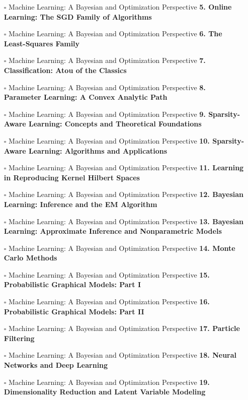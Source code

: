 \documentclass[a4, landscape, 12pt]{article}
\newcommand{\checkbox}{$\square$}%
\begin{document}
\begin{itemize}
{}
\item [\checkbox]  Machine Learning: A Bayesian and Optimization Perspective \textbf{ 5. Online Learning: The SGD Family of Algorithms
}
\item [\checkbox]  Machine Learning: A Bayesian and Optimization Perspective \textbf{ 6. The Least-Squares Family
}
\item [\checkbox]  Machine Learning: A Bayesian and Optimization Perspective \textbf{ 7. Classification: Atou of the Classics
}
\item [\checkbox]  Machine Learning: A Bayesian and Optimization Perspective \textbf{ 8. Parameter Learning: A Convex Analytic Path
}
\item [\checkbox]  Machine Learning: A Bayesian and Optimization Perspective \textbf{ 9. Sparsity-Aware Learning: Concepts and Theoretical Foundations
}
\item [\checkbox]  Machine Learning: A Bayesian and Optimization Perspective \textbf{ 10. Sparsity-Aware Learning: Algorithms and Applications
}
\item [\checkbox]  Machine Learning: A Bayesian and Optimization Perspective \textbf{ 11. Learning in Reproducing Kernel Hilbert Spaces
}
\item [\checkbox]  Machine Learning: A Bayesian and Optimization Perspective \textbf{ 12. Bayesian Learning: Inference and the EM Algorithm
}
\item [\checkbox]  Machine Learning: A Bayesian and Optimization Perspective \textbf{ 13. Bayesian Learning: Approximate Inference and Nonparametric Models
}
\item [\checkbox]  Machine Learning: A Bayesian and Optimization Perspective \textbf{ 14. Monte Carlo Methods
}
\item [\checkbox]  Machine Learning: A Bayesian and Optimization Perspective \textbf{ 15. Probabilistic Graphical Models: Part I
}
\item [\checkbox]  Machine Learning: A Bayesian and Optimization Perspective \textbf{ 16. Probabilistic Graphical Models: Part II
}
\item [\checkbox]  Machine Learning: A Bayesian and Optimization Perspective \textbf{ 17. Particle Filtering
}
\item [\checkbox]  Machine Learning: A Bayesian and Optimization Perspective \textbf{ 18. Neural Networks and Deep Learning
}
\item [\checkbox]  Machine Learning: A Bayesian and Optimization Perspective \textbf{ 19. Dimensionality Reduction and Latent Variable Modeling
}
\end{itemize}
\end{document}
